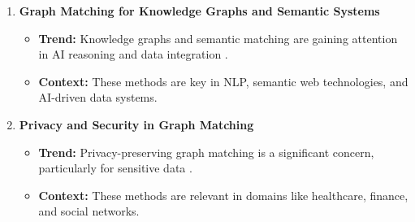 \begin{enumerate}
            \item \textbf{Graph Matching for Knowledge Graphs and Semantic Systems}
            \begin{itemize}
                \item \textbf{Trend:} Knowledge graphs and semantic matching are gaining attention in AI reasoning and data integration \cite{knowledge_graph_matching}.
                \item \textbf{Context:} These methods are key in NLP, semantic web technologies, and AI-driven data systems.
            \end{itemize}
        
            \item \textbf{Privacy and Security in Graph Matching}
            \begin{itemize}
                \item \textbf{Trend:} Privacy-preserving graph matching is a significant concern, particularly for sensitive data \cite{privacy_graph_matching}.
                \item \textbf{Context:} These methods are relevant in domains like healthcare, finance, and social networks.
            \end{itemize}
        \end{enumerate}
        
